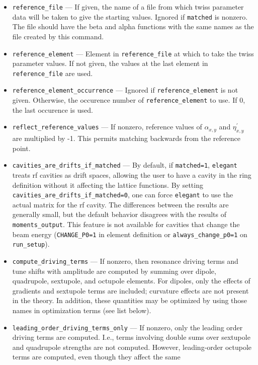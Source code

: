 \documentclass[11pt]{article}
\begin{document}
\begin{itemize}
\item \verb|reference_file| --- If given, the name of a file from which twiss parameter data will
        be taken to give the starting values.  Ignored if \verb|matched| is nonzero.  The file
        should have the beta and alpha functions with the same names as the file created by
        this command.
\item \verb|reference_element| --- Element in \verb|reference_file| at which to take the
        twiss parameter values.  If not given, the values at the last element in \verb|reference_file|
        are used.
\item \verb|reference_element_occurrence| --- Ignored if \verb|reference_element| is not given.
        Otherwise, the occurence number of \verb|reference_element| to use.  If 0, the last
        occurence is used.
\item \verb|reflect_reference_values| --- If nonzero, reference values of $\alpha_{x,y}$ and $\eta^\prime_{x,y}$ are
  multiplied by -1.  This permits matching backwards from the reference point.
\item \verb|cavities_are_drifts_if_matched| --- By default,  if \verb|matched=1|, {\tt elegant} treats rf cavities
  as drift spaces, allowing the user to have a cavity in the ring definition without it affecting the lattice functions.
  By setting \verb|cavities_are_drifts_if_matched=0|, one can force {\tt elegant} to use the actual matrix for the
  rf cavity.  The differences between the 
  results are generally small, but the default behavior disagrees with the results of \verb|moments_output|.
  This feature is not available for cavities that change the beam energy (\verb|CHANGE_P0=1| in element definition 
  or \verb|always_change_p0=1| on \verb|run_setup|).
\item \verb|compute_driving_terms| --- If nonzero, then resonance driving terms \cite{Bengtsson, WangCXDrivingTerms, Bengtsson-SSC232} and
 tune shifts with amplitude are computed by summing over dipole, quadrupole, sextupole, and octupole elements.  For dipoles, only the effects of gradients and
 sextupole terms are included; curvature effects are not present in the theory.   In addition, these quantities may be optimized 
 by using those names in optimization terms (see list below).
\item \verb|leading_order_driving_terms_only| --- If nonzero, only the leading order driving terms are computed. I.e., terms involving double sums
  over sextupole and quadrupole strengths are not computed. However, leading-order octupole terms are computed, even though they affect the same

\end{itemize}
\end{document}
